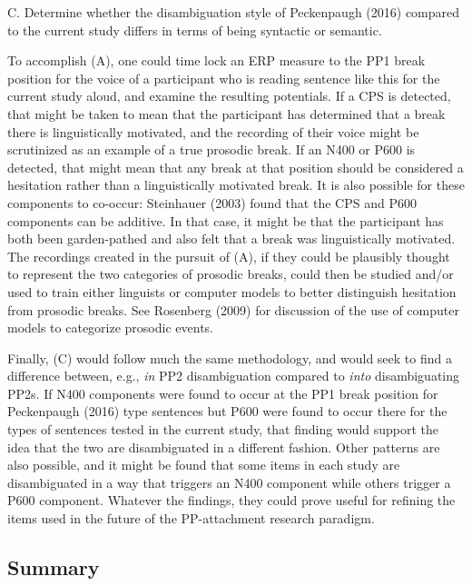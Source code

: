 \documentclass[11pt,oneside]{book}
\begin{document}
C. Determine whether the disambiguation style of Peckenpaugh (2016) compared to the current study differs in terms of being syntactic or semantic.

To accomplish (A), one could time lock an ERP measure to the PP1 break position for the voice of a participant who is reading sentence like this for the current study aloud, and examine the resulting potentials. If a CPS is detected, that might be taken to mean that the participant has determined that a break there is linguistically motivated, and the recording of their voice might be scrutinized as an example of a true prosodic break. If an N400 or P600 is detected, that might mean that any break at that position should be considered a hesitation rather than a linguistically motivated break. It is also possible for these components to co-occur: Steinhauer (2003) found that the CPS and P600 components can be additive. In that case, it might be that the participant has both been garden-pathed and also felt that a break was linguistically motivated. The recordings created in the pursuit of (A), if they could be plausibly thought to represent the two categories of prosodic breaks, could then be studied and/or used to train either linguists or computer models to better distinguish hesitation from prosodic breaks. See Rosenberg (2009) for discussion of the use of computer models to categorize prosodic events.

Finally, (C) would follow much the same methodology, and would seek to find a difference between, e.g., \emph{in} PP2 disambiguation compared to \emph{into} disambiguating PP2s. If N400 components were found to occur at the PP1 break position for Peckenpaugh (2016) type sentences but P600 were found to occur there for the types of sentences tested in the current study, that finding would support the idea that the two are disambiguated in a different fashion. Other patterns are also possible, and it might be found that some items in each study are disambiguated in a way that triggers an N400 component while others trigger a P600 component. Whatever the findings, they could prove useful for refining the items used in the future of the PP-attachment research paradigm.

\hypertarget{summary-1}{%
\subsection{Summary}\label{summary-1}}
\end{document}
